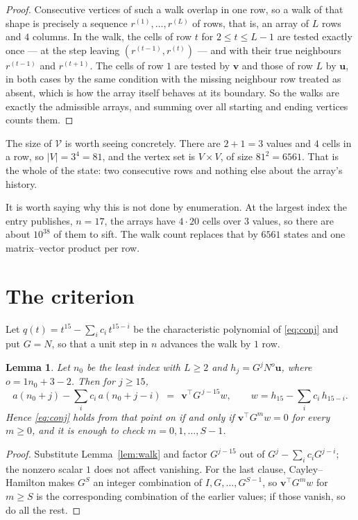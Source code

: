 \documentclass[11pt,a4paper]{article}
\theoremstyle{plain}
\newtheorem{lemma}[theorem]{Lemma}
\theoremstyle{definition}
\begin{document}
\begin{proof}
Consecutive vertices of such a walk overlap in one row, so a walk of that shape is
precisely a sequence $r^{(1)},\dots,r^{(L)}$ of rows, that is, an array of $L$ rows
and $4$ columns. In the walk, the cells of row $t$ for $2\le t\le L-1$ are tested
exactly once --- at the step leaving $(r^{(t-1)},r^{(t)})$ --- and with their true
neighbours $r^{(t-1)}$ and $r^{(t+1)}$. The cells of row $1$ are tested by
$\mathbf{v}$ and those of row $L$ by $\mathbf{u}$, in both cases by the same condition
with the missing neighbour row treated as absent, which is how the array itself behaves at
its boundary. So the walks are exactly the admissible arrays, and summing over all starting
and ending vertices counts them.
\end{proof}


The size of $\mathcal V$ is worth seeing concretely. There are $2+1=3$ values
and $4$ cells in a row, so $|V|=3^{4}=81$, and the vertex set is
$V\times V$, of size $81^2=6561$. That is the whole of the state: two consecutive
rows and nothing else about the array's history.

It is worth saying why this is not done by enumeration. At the largest index the entry
publishes, $n=17$, the arrays have $4\cdot20$ cells over
$3$ values, so there are about $10^{38}$ of them to sift. The
walk count replaces that by $6561$ states and one matrix--vector product per row.
\section{The criterion}

Let $q(t)=t^{15}-\sum_i c_i\,t^{15-i}$ be the characteristic polynomial of
\eqref{eq:conj} and put $G=N$, so that a unit step in $n$ advances the walk by
$1$ row.

\begin{lemma}\label{lem:crit}
Let $n_0$ be the least index with $L\ge2$ and $h_j=G^{j}N^{o}\mathbf{u}$, where
$o=1n_0+3-2$. Then for $j\ge15$,
\[
a(n_0+j)-\sum_i c_i\,a(n_0+j-i)\;=\;\,\mathbf{v}^{\!\top}G^{\,j-15}w,
\qquad w=h_{15}-\sum_i c_i\,h_{15-i} .
\]
Hence \eqref{eq:conj} holds from that point on if and only if
$\mathbf{v}^{\!\top}G^{m}w=0$ for every $m\ge0$, and it is enough to check
$m=0,1,\dots,S-1$.
\end{lemma}

\begin{proof}
Substitute Lemma~\ref{lem:walk} and factor $G^{j-15}$ out of
$G^{j}-\sum_ic_iG^{j-i}$; the nonzero scalar $1$ does not affect
vanishing. For the last clause, Cayley--Hamilton makes $G^{S}$ an integer combination of
$I,G,\dots,G^{S-1}$, so $\mathbf{v}^{\!\top}G^{m}w$ for $m\ge S$ is the corresponding
combination of the earlier values; if those vanish, so do all the rest.
\end{proof}
\end{document}
